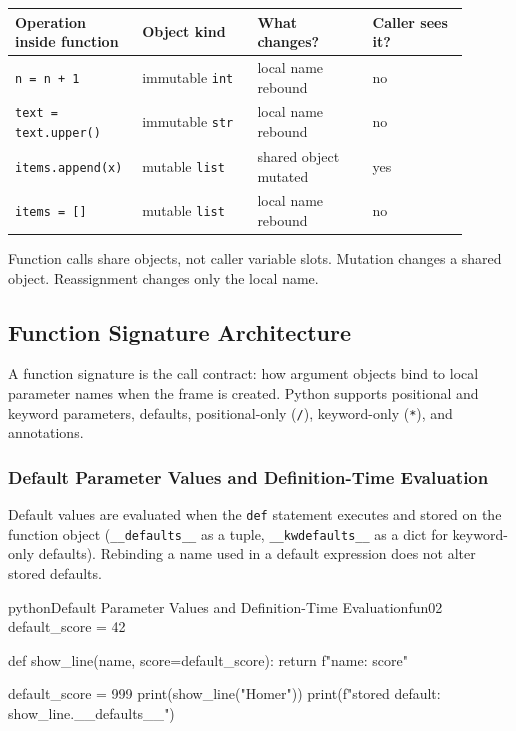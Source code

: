 \documentclass[a4paper,twoside]{report}
\begin{document}
\begin{center}
\begin{tabular}{|p{0.22\linewidth}|p{0.24\linewidth}|p{0.24\linewidth}|p{0.20\linewidth}|}
\hline
\textbf{Operation inside function} & \textbf{Object kind} & \textbf{What changes?} & \textbf{Caller sees it?} \\
\hline
\texttt{n = n + 1} & immutable \texttt{int} & local name rebound & no \\
\hline
\texttt{text = text.upper()} & immutable \texttt{str} & local name rebound & no \\
\hline
\texttt{items.append(x)} & mutable \texttt{list} & shared object mutated & yes \\
\hline
\texttt{items = []} & mutable \texttt{list} & local name rebound & no \\
\hline
\end{tabular}
\end{center}

Function calls share objects, not caller variable slots. Mutation changes a shared object. Reassignment changes only the local name.


\subsection{Function Signature Architecture}

A function signature is the call contract: how argument objects bind to local parameter names when the frame is created. Python supports positional and keyword parameters, defaults, positional-only (\texttt{/}), keyword-only (\texttt{*}), and annotations.

\subsubsection{Default Parameter Values and Definition-Time Evaluation}

Default values are evaluated when the \texttt{def} statement executes and stored on the function object (\texttt{\_\_defaults\_\_} as a tuple, \texttt{\_\_kwdefaults\_\_} as a dict for keyword-only defaults). Rebinding a name used in a default expression does not alter stored defaults.

\begin{codebox}[]{python}{Default Parameter Values and Definition-Time Evaluation}{fun02}
default_score = 42

def show_line(name, score=default_score):
    return f"{name}: {score}"

default_score = 999
print(show_line("Homer"))
print(f"stored default: {show_line.__defaults__}")
\end{codebox}
\end{document}
